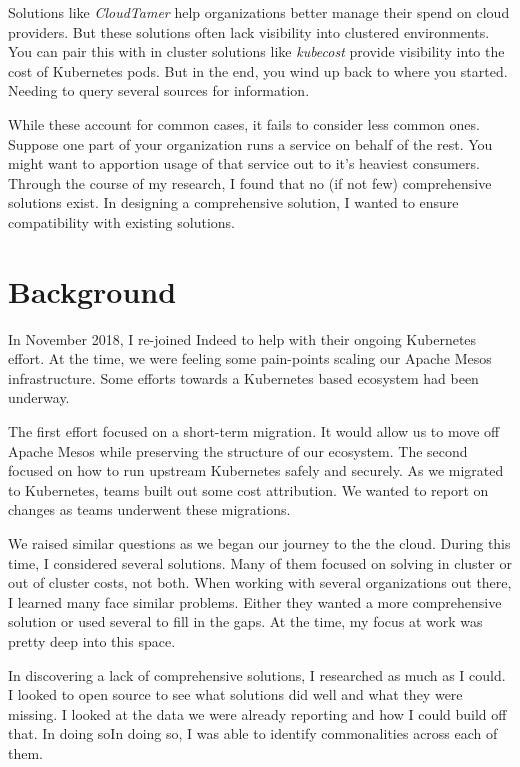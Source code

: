 \documentclass[10pt, a4paper, twocolumn]{article}
\begin{document}
  Solutions like \textit{CloudTamer} help organizations better manage their spend on cloud providers.
  But these solutions often lack visibility into clustered environments.
  You can pair this with in cluster solutions like \textit{kubecost} provide visibility into the cost of Kubernetes pods.
  But in the end, you wind up back to where you started.
  Needing to query several sources for information.

  While these account for common cases, it fails to consider less common ones.
  Suppose one part of your organization runs a service on behalf of the rest.
  You might want to apportion usage of that service out to it's heaviest consumers.
  Through the course of my research, I found that no (if not few) comprehensive solutions exist.
  In designing a comprehensive solution, I wanted to ensure compatibility with existing solutions.


\section*{Background}
  In November 2018, I re-joined Indeed to help with their ongoing Kubernetes effort.
  At the time, we were feeling some pain-points scaling our Apache Mesos infrastructure.
  Some efforts towards a Kubernetes based ecosystem had been underway.

  The first effort focused on a short-term migration.
  It would allow us to move off Apache Mesos while preserving the structure of our ecosystem.
  The second focused on how to run upstream Kubernetes safely and securely.
  As we migrated to Kubernetes, teams built out some cost attribution.
  We wanted to report on changes as teams underwent these migrations.

  We raised similar questions as we began our journey to the the cloud.
  During this time, I considered several solutions.
  Many of them focused on solving in cluster or out of cluster costs, not both.
  When working with several organizations out there, I learned many face similar problems.
  Either they wanted a more comprehensive solution or used several to fill in the gaps.
  At the time, my focus at work was pretty deep into this space.

  In discovering a lack of comprehensive solutions, I researched as much as I could.
  I looked to open source to see what solutions did well and what they were missing.
  I looked at the data we were already reporting and how I could build off that.
  In doing soIn doing so, I was able to identify commonalities across each of them.
\end{document}
